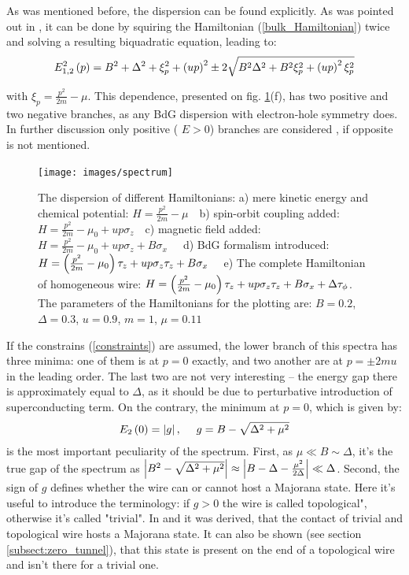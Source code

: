 As was mentioned before, the dispersion can be found explicitly. As was pointed out in \cite{Oreg_2010}, it can be done by squiring the Hamiltonian (\ref{bulk_Hamiltonian}) twice and solving a resulting biquadratic equation, leading to:
\begin{equation}
E^2_{1,2}\left(p\right)
=
B^2
+
\Delta^2
+
\xi_p^2
+
\left(up\right)^2
\pm	
2\sqrt{
	B^2 \Delta^2
	+
	B^2\xi_p^2
	+
	\left(up\right)^2\xi_p^2
}
\end{equation}

with $ \xi_p =\frac{p^2}{2m}-\mu$. This dependence, presented on fig. \ref{fig:spectrum}(f), has two positive and two negative branches, as any BdG dispersion with electron-hole symmetry does. In further discussion only positive (	$ E>0 $) branches are considered $  $, if opposite is not mentioned.

\begin{figure}[H]
	\centering
	\texttt{[image: images/spectrum]}
	\caption{The dispersion of different Hamiltonians:
		 a)  mere kinetic energy and chemical potential: $ H =\frac{ p^2}{2m} - \mu ~~~$
		 b) spin-orbit coupling added: $ 	H = \frac{p^2}{2m}-\mu_0 + u p \sigma_z ~~~$
		 c) magnetic field added: $ 	H = \frac{p^2}{2m} 	-\mu_0  +u p \sigma_z  + B\sigma_x ~~~~~$
		 d) BdG formalism introduced: $ 	H = \left(\frac{p^2}{2m} 	-\mu_0 \right)\tau_z +u p \sigma_z \tau_z + B\sigma_x	~~~ $
		 e) The complete Hamiltonian of homogeneous wire: $ 	H = \left(\frac{p^2}{2m} 	-\mu_0 \right)\tau_z +u p \sigma_z \tau_z + B\sigma_x	+ \Delta\tau_\phi $.
		 The parameters of the Hamiltonians for the plotting are: $ B=0.2 $, $ \Delta=0.3 $, $ u=0.9 $, $ m = 1 $, $ \mu = 0.11 $ 
 }
	\label{fig:spectrum}
\end{figure}

If the constrains (\ref{constraints}) are assumed, the lower branch of this spectra has three minima: one of them is at $ p=0 $ exactly, and two another are at $ p = \pm 2mu $ in the leading order. The last two are not very interesting -- the energy gap  there is approximately equal to $ \Delta $, as it should be due to perturbative introduction of superconducting term. On the contrary, the minimum at $ p=0 $, which is given by\cite{Oreg_2010}:
\begin{gather}
	E_2\left(0\right)=\left|g\right|,~~~~g = B -\sqrt{\Delta^2+\mu^2}
\end{gather}
is the most important peculiarity of the spectrum. First, as $\mu\ll B \sim \Delta $, it's the true gap of the spectrum as $  \left|B^2 -\sqrt{\Delta^2+\mu^2}\right| \approx  \left|B-\Delta -\frac{\mu^2}{2\Delta}\right|\ll\Delta$. Second, the  sign of  $ g $ defines whether the wire can or cannot host a Majorana state. Here it's useful to introduce the terminology: if $ g>0 $ the wire is called topological", otherwise it's called "trivial". In \cite{Oreg_2010} and \cite{Lutchyn_2010} it was derived, that the contact of trivial and topological wire hosts a Majorana state. It can also be shown (see section \ref{subsect:zero_tunnel}), that this state is present on the end of a topological wire and isn't there for a trivial one.

